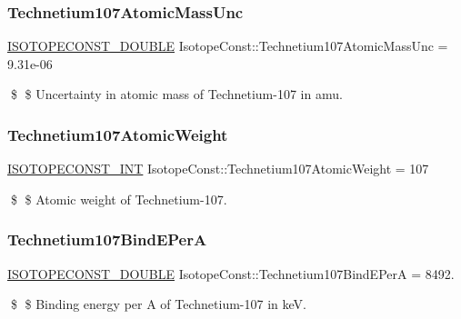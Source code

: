 \subsubsection{\texorpdfstring{Technetium107\+Atomic\+Mass\+Unc}{Technetium107AtomicMassUnc}}
{\footnotesize\ttfamily \mbox{\hyperlink{group___isotope_const-_macros_ga8f45a7272ce02c0b4c65c44636ed719a}{I\+S\+O\+T\+O\+P\+E\+C\+O\+N\+S\+T\+\_\+\+D\+O\+U\+B\+LE}} Isotope\+Const\+::\+Technetium107\+Atomic\+Mass\+Unc = 9.\+31e-\/06}

\$ \$ Uncertainty in atomic mass of Technetium-\/107 in amu. \mbox{\label{group___isotope_const-_technetium-_tc107_ga366b834e8d9d8ea344736aa7164bc827}} 
\subsubsection{\texorpdfstring{Technetium107\+Atomic\+Weight}{Technetium107AtomicWeight}}
{\footnotesize\ttfamily \mbox{\hyperlink{group___isotope_const-_macros_ga5f18360b3e99483a35c32d789e62621c}{I\+S\+O\+T\+O\+P\+E\+C\+O\+N\+S\+T\+\_\+\+I\+NT}} Isotope\+Const\+::\+Technetium107\+Atomic\+Weight = 107}

\$ \$ Atomic weight of Technetium-\/107. \mbox{\label{group___isotope_const-_technetium-_tc107_gadc0a928c288f65c8acf20c7be3ac908f}} 
\subsubsection{\texorpdfstring{Technetium107\+Bind\+E\+PerA}{Technetium107BindEPerA}}
{\footnotesize\ttfamily \mbox{\hyperlink{group___isotope_const-_macros_ga8f45a7272ce02c0b4c65c44636ed719a}{I\+S\+O\+T\+O\+P\+E\+C\+O\+N\+S\+T\+\_\+\+D\+O\+U\+B\+LE}} Isotope\+Const\+::\+Technetium107\+Bind\+E\+PerA = 8492.}

\$ \$ Binding energy per A of Technetium-\/107 in keV. \mbox{\label{group___isotope_const-_technetium-_tc107_ga6e008587c7036d736d6441a3d0c7beea}} 
